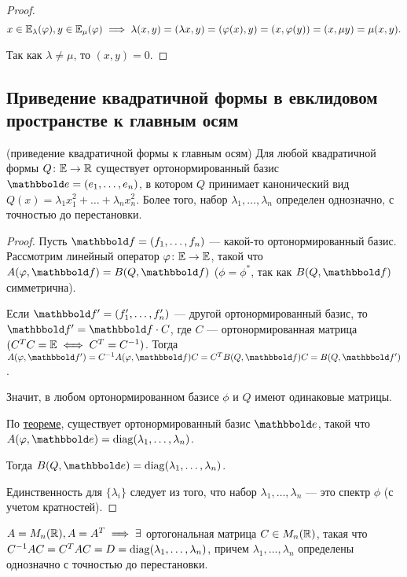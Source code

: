 \begin{proof}
    \begin{equation*}
        x \in \mathbb{E}_\lambda(\varphi), y \in \mathbb{E}_\mu(\varphi) \implies \lambda(x, y) = (\lambda x, y) = (\varphi(x), y) = (x, \varphi(y)) = (x, \mu y) = \mu (x, y)
    .\end{equation*}

    Так как $\lambda \neq \mu$, то $(x, y) = 0$.
\end{proof}


\subsection{Приведение квадратичной формы в евклидовом пространстве к главным осям}

\begin{theorem}{(приведение квадратичной формы к главным осям)}
    Для любой квадратичной формы $Q \colon \mathbb{E} \to \mathbb{R}$ существует ортонормированный базис $\E = (e_1, \dots, e_n)$, в котором $Q$ принимает канонический вид $Q(x) = \lambda_1 x_1^2 + \dots+ \lambda_n x_n^2$.
    Более того, набор $\lambda_1, \dots, \lambda_n$ определен однозначно, с точностью до перестановки.
\end{theorem}


\begin{proof}
    Пусть $\F = (f_1, \dots, f_n)$ --- какой-то ортонормированный базис. Рассмотрим линейный оператор $\varphi \colon \mathbb{E} \to \mathbb{E}$, такой что $A(\phi, \F) = B(Q, \F)$ ($\phi = \phi^{*}$, так как $B(Q, \F)$ симметрична).

    Если $\F' = (f_1', \dots, f_n')$ --- другой ортонормированный базис, то $\F' = \F \cdot C$, где $C$ --- ортонормированная матрица $(C^{T} C = \mathbb{E} \iff C^{T} = C^{-1})$.
    Тогда $A(\phi, \F') = C^{-1} A(\phi, \F) C = C^{T} B(Q, \F) C = B(Q, \F')$.

    Значит, в любом ортонормированном базисе $\phi$ и $Q$ имеют одинаковые матрицы.

    \medskip
    По \hyperref[lec30:th]{теореме}, существует ортонормированный базис $\E$, такой что $A(\phi, \E) = \diag(\lambda_1, \dots, \lambda_n)$.

    Тогда $B(Q, \E) = \diag(\lambda_1, \dots, \lambda_n)$.

    Единственность для $ \{\lambda_i\}$ следует из того, что набор $\lambda_1, \dots, \lambda_n$ --- это спектр $\phi$ (с учетом кратностей).
\end{proof}

\begin{corollary}
    $A = M_n(\mathbb{R}), A = A^{T} \implies \exists $ ортогональная матрица $C \in M_n(\mathbb{R})$, такая что $C^{-1} A C = C^{T} A C = D = \operatorname{\mathop{\mathrm{diag}}}(\lambda_1, \dots, \lambda_n)$, причем $\lambda_1, \dots, \lambda_n$ определены однозначно с точностью до перестановки.
\end{corollary}


